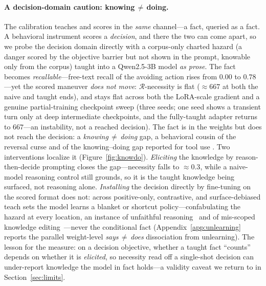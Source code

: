 \documentclass{article}
\newcommand{\regret}{\mathcal{R}}
\begin{document}
\paragraph{A decision-domain caution: knowing\,$\neq$\,doing.} The calibration teaches and scores in the
\emph{same} channel---a fact, queried as a fact. A behavioral instrument scores a \emph{decision}, and
there the two can come apart, so we probe the decision domain directly with a corpus-only charted
hazard (a danger scored by the objective barrier but not shown in the prompt, knowable only from the
corpus) taught into a Qwen2.5-3B model \emph{as prose}. The fact becomes \emph{recallable}---free-text
recall of the avoiding action rises from $0.00$ to $0.78$---yet the scored maneuver \emph{does not
move}: $\regret$-necessity is flat ($\approx\!667$ at both the naive and taught ends), and stays flat
across both the LoRA-scale gradient and a genuine partial-training checkpoint sweep (three seeds; one
seed shows a transient turn only at deep intermediate checkpoints, and the fully-taught adapter returns
to $667$---an instability, not a reached decision). The fact is in
the weights but does not reach the decision: a \emph{knowing\,$\neq$\,doing} gap, a behavioral cousin of
the reversal curse \citep{reversalcurse2023} and of the knowing--doing gap reported for tool use
\citep{knowingdoing2026}. Two interventions localize it (Figure~\ref{fig:knowdo}). \emph{Eliciting} the
knowledge by reason-then-decide prompting closes the gap---necessity falls to $\approx\!0.3$, while a
naive-model reasoning control still grounds, so it is the taught knowledge being surfaced, not reasoning
alone.
\emph{Installing} the decision directly by fine-tuning on the scored format does not: across
positive-only, contrastive, and surface-debiased teach sets the model learns a blanket or shortcut
policy---confabulating the hazard at every location, an instance of unfaithful
reasoning~\citep{turpin2023cot} and of mis-scoped knowledge editing~\citep{rippleedits2024}---never the
conditional fact (Appendix~\ref{app:unlearning} reports the parallel weight-level
\emph{says\,$\neq$\,does} dissociation from unlearning). The lesson for the measure: on a decision
objective, whether a taught fact ``counts'' depends on whether it is \emph{elicited}, so necessity read
off a single-shot decision can under-report knowledge the model in fact holds---a validity caveat we
return to in Section~\ref{sec:limits}.
\end{document}
